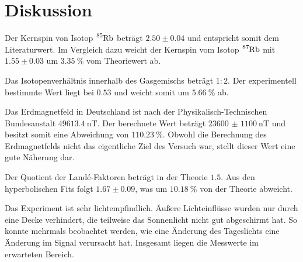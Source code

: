\section{Diskussion}
\label{sec:Diskussion}

Der Kernspin von Isotop $\ce{^{85}Rb}$ beträgt $2.50 \pm 0.04$ und entspricht somit dem Literaturwert.
Im Vergleich dazu weicht der Kernspin vom Isotop $\ce{^{87}Rb}$ mit $1.55 \pm 0.03$ um $\qty{3.35}{\percent}$ vom Theoriewert ab.

Das Isotopenverhältnis innerhalb des Gasgemischs beträgt $1:2$.
Der experimentell bestimmte Wert liegt bei $0.53$ und weicht somit um $\qty{5.66}{\percent}$ ab.

Das Erdmagnetfeld in Deutschland ist nach der Physikalisch-Technischen Bundesanstalt $\qty{49613.4}{\nano\tesla}$. \cite{erdfeld}
Der berechnete Wert beträgt $\qty{23600(1100)}{\nano\tesla}$ und besitzt somit eine Abweichung von $\qty{110.23}{\percent}$.
Obwohl die Berechnung des Erdmagnetfelds nicht das eigentliche Ziel des Versuch war, stellt dieser Wert eine gute Näherung dar.

Der Quotient der Landé-Faktoren beträgt in der Theorie $1.5$.
Aus den hyperbolischen Fits folgt $1.67 \pm 0.09$, was um $\qty{10.18}{\percent}$ von der Theorie abweicht.

Das Experiment ist sehr lichtempfindlich. Äußere Lichteinflüsse wurden nur durch eine Decke verhindert, die teilweise das Sonnenlicht nicht gut abgeschirmt hat.
So konnte mehrmals beobachtet werden, wie eine Änderung des Tageslichts eine Änderung im Signal verursacht hat.
Insgesamt liegen die Messwerte im erwarteten Bereich.